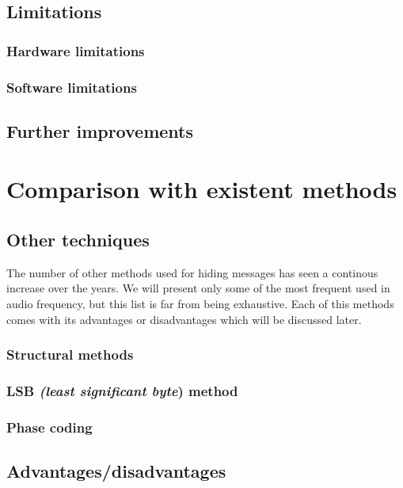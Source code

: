 \documentclass[12pt]{report}
\begin{document}
\section{Limitations}
\subsection{Hardware limitations}
\subsection{Software limitations}

\section{Further improvements}

\chapter{Comparison with existent methods}

\section{Other techniques}
The number of other methods used for hiding messages has seen a continous increase over the years. We will present only some of the most frequent used in audio frequency, but this list is far from being exhaustive. Each of this methods comes with its advantages or disadvantages which will be discussed later.
\subsection{Structural methods}
\subsection{LSB \emph{(least significant byte}) method}
\subsection{Phase coding}
\section{Advantages/disadvantages}
\end{document}
